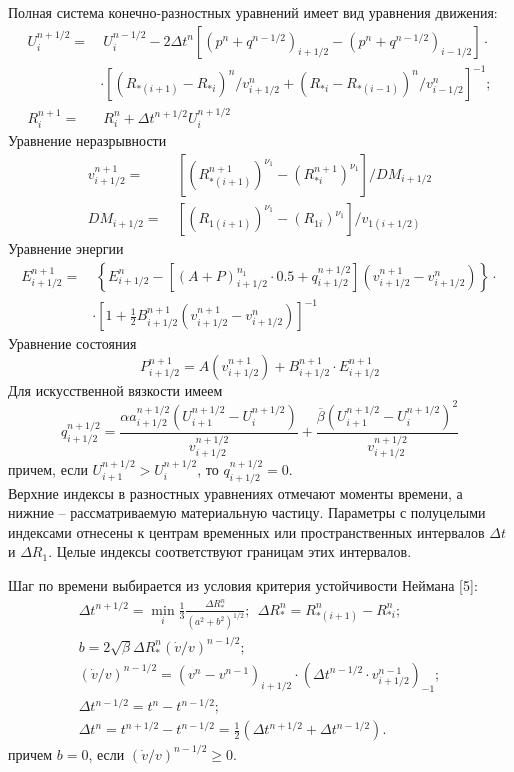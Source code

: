 \documentclass[specialist, subf, href, colorlinks=true, 14pt, final]{disser}
\theoremstyle{definition}
\begin{document}
Полная система конечно-разностных уравнений имеет вид уравнения движения:
\begin{align*}
  U_{i}^{n + 1/2} =&\ U_{i}^{n - 1/2} - 2\Delta t^{n} \left[(p^{n} + q^{n - 1/2})_{i+ 1/2} - (p^{n} + q^{n - 1/2})_{i- 1/2}\right]\cdot\\
  & \cdot \left[(R_{*(i+1)} - R_{*i})^{n} / v_{i + 1/2}^{n} + (R_{*i} - R_{*(i-1)})^{n} / v_{i - 1/2}^{n} \right]^{-1};\\
  R_{i}^{n+1} =&\ R_{i}^{n} + \Delta t^{n + 1/2} U_{i}^{n + 1/2}
\end{align*}
Уравнение неразрывности
\begin{align*}
  v_{i + 1/2}^{n + 1} =&\ \left[(R_{*(i+1)}^{n+1})^{\nu_1} - (R_{*i}^{n+1})^{\nu_1}\right] / DM_{i+1/2}\\
  DM_{i+1/2} =&\ \left[(R_{1(i+1)})^{\nu_1} - (R_{1i})^{\nu_1}\right] / v_{1(i + 1/2)}
\end{align*}
Уравнение энергии
\begin{align*}
  E_{i + 1/2}^{n+1} =&\ \left\{E_{i + 1/2}^{n} - \left[(A+P)_{i+1/2}^{n_1}\cdot 0.5 + q_{i+1/2}^{n+1/2}\right]\left(v_{i+1/2}^{n+1} - v_{i+1/2}^{n}\right) \right\} \cdot\\
  & \cdot \left[ 1 + \frac{1}{2}B_{i+1/2}^{n+1} (v_{i+1/2}^{n+1} - v_{i+1/2}^{n}) \right]^{-1}
\end{align*}
Уравнение состояния
\[
  P_{i+1/2}^{n+1} = A(v_{i+1/2}^{n+1}) + B_{i+1/2}^{n+1}\cdot E_{i+1/2}^{n+1}
\]
Для искусственной вязкости имеем
\[
  q_{i+1/2}^{n+1/2} = \frac{\alpha a_{i+1/2}^{n+1/2} (U_{i+1}^{n+1/2} - U_{i}^{n+1/2})}{v_{i+1/2}^{n+1/2}} + \frac{\overline{\beta} (U_{i+1}^{n + 1/2} - U_{i}^{n + 1/2})^{2}}{v_{i+1/2}^{n+1/2}}
\]
причем, если $U_{i+1}^{n+1/2} > U_{i}^{n + 1/2}$, то $q_{i+1/2}^{n+1/2} = 0$.\\
Верхние индексы в разностных уравнениях отмечают моменты времени, а нижние -- рассматриваемую материальную частицу. Параметры с полуцелыми индексами отнесены к центрам временных или пространственных интервалов $\Delta t$ и $\Delta R_1$. Целые индексы соответствуют границам этих интервалов. 

Шаг по времени выбирается из условия критерия устойчивости Неймана [5]:
\[
  \begin{aligned}
  \Delta t^{n+1/2} = \min\limits_{i} \frac{1}{3}\frac{\Delta R_{*}^{n}}{(a^{2}+b^{2})^{1/2}};\ \ \Delta R_{*}^{n} = R_{*(i+1)}^{n} - R_{*i}^{n};\\
  b = 2\sqrt{\beta}\Delta R_{*}^{n}(\dot{v}/v)^{n-1/2};\\ 
  (\dot{v}/v)^{n-1/2} = (v^{n} - v^{n-1})_{i+1/2}\cdot (\Delta t^{n-1/2}\cdot v^{n-1}_{i+1/2})_{-1};\\
  \Delta t^{n-1/2} = t^{n} - t^{n - 1/2};\\
  \Delta t^{n} = t^{n+1/2} - t^{n-1/2} = \frac{1}{2}(\Delta t^{n+1/2} + \Delta t^{n-1/2}).
  \end{aligned}
\]
причем $b=0$, если $(\dot{v}/v)^{n-1/2} \geqslant 0$.
\end{document}
